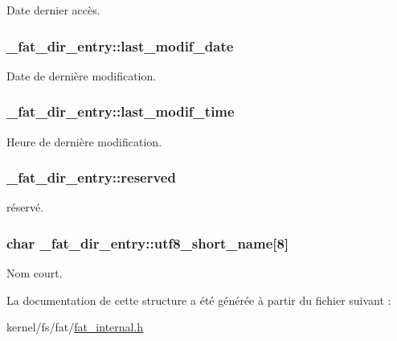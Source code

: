 Date dernier accès. \hypertarget{struct__fat__dir__entry_a9be27b92458730fbdf5342f717aadc32}{
\subsubsection[{last\-\_\-modif\-\_\-date}]{ \-\_\-fat\-\_\-dir\-\_\-entry\-::last\-\_\-modif\-\_\-date}}\label{struct__fat__dir__entry_a9be27b92458730fbdf5342f717aadc32}
Date de dernière modification. \hypertarget{struct__fat__dir__entry_a967f3fe06020a24a22bc83cb80637669}{
\subsubsection[{last\-\_\-modif\-\_\-time}]{ \-\_\-fat\-\_\-dir\-\_\-entry\-::last\-\_\-modif\-\_\-time}}\label{struct__fat__dir__entry_a967f3fe06020a24a22bc83cb80637669}
Heure de dernière modification. \hypertarget{struct__fat__dir__entry_a27e7962cefa12233338034dff3d75304}{
\subsubsection[{reserved}]{ \-\_\-fat\-\_\-dir\-\_\-entry\-::reserved}}\label{struct__fat__dir__entry_a27e7962cefa12233338034dff3d75304}
réservé. \hypertarget{struct__fat__dir__entry_abb18201b12e6039275e6dad91c19a99d}{
\subsubsection[{utf8\-\_\-short\-\_\-name}]{\setlength{\rightskip}{0pt plus 5cm}char \-\_\-fat\-\_\-dir\-\_\-entry\-::utf8\-\_\-short\-\_\-name\mbox{[}8\mbox{]}}}\label{struct__fat__dir__entry_abb18201b12e6039275e6dad91c19a99d}
Nom court. 

La documentation de cette structure a été générée à partir du fichier suivant \-:\begin{DoxyCompactItemize}
\item 
kernel/fs/fat/\hyperlink{fat__internal_8h}{fat\-\_\-internal.\-h}\end{DoxyCompactItemize}
